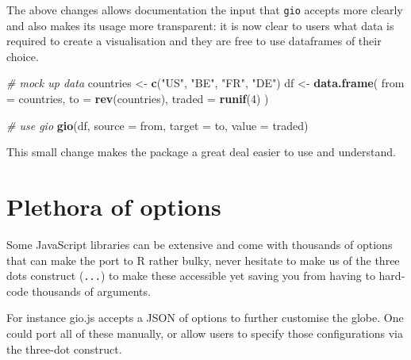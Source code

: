\documentclass[
]{krantz}
\makeatletter
\newenvironment{Shaded}{\begin{snugshade}}{\end{snugshade}}
\newcommand{\CommentTok}[1]{\textcolor[rgb]{0.37,0.37,0.37}{\textit{#1}}}
\newcommand{\DataTypeTok}[1]{\textcolor[rgb]{0.27,0.27,0.27}{#1}}
\newcommand{\DecValTok}[1]{\textcolor[rgb]{0.06,0.06,0.06}{#1}}
\newcommand{\KeywordTok}[1]{\textcolor[rgb]{0.27,0.27,0.27}{\textbf{#1}}}
\newcommand{\NormalTok}[1]{#1}
\newcommand{\StringTok}[1]{\textcolor[rgb]{0.5,0.5,0.5}{#1}}
\newenvironment{kframe}{%
\medskip{}
\setlength{\fboxsep}{.8em}
 \def\at@end@of@kframe{}%
 \ifinner\ifhmode%
  \def\at@end@of@kframe{\end{minipage}}%
  \begin{minipage}{\columnwidth}%
 \fi\fi%
 \def\FrameCommand##1{\hskip\@totalleftmargin \hskip-\fboxsep
 \colorbox{shadecolor}{##1}\hskip-\fboxsep
     \hskip-\linewidth \hskip-\@totalleftmargin \hskip\columnwidth}%
 \MakeFramed {\advance\hsize-\width
   \@totalleftmargin\z@ \linewidth\hsize
   \@setminipage}}%
 {\par\unskip\endMakeFramed%
 \at@end@of@kframe}
\renewenvironment{Shaded}{\begin{kframe}}{\end{kframe}}
\makeatother
\begin{document}
The above changes allows documentation the input that \texttt{gio} accepts more clearly and also makes its usage more transparent: it is now clear to users what data is required to create a visualisation and they are free to use dataframes of their choice.

\begin{Shaded}
\begin{Highlighting}[]
\CommentTok{\# mock up data}
\NormalTok{countries <{-}}\StringTok{ }\KeywordTok{c}\NormalTok{(}\StringTok{"US"}\NormalTok{, }\StringTok{"BE"}\NormalTok{, }\StringTok{"FR"}\NormalTok{, }\StringTok{"DE"}\NormalTok{)}
\NormalTok{df <{-}}\StringTok{ }\KeywordTok{data.frame}\NormalTok{(}
  \DataTypeTok{from =}\NormalTok{ countries,}
  \DataTypeTok{to =} \KeywordTok{rev}\NormalTok{(countries),}
  \DataTypeTok{traded =} \KeywordTok{runif}\NormalTok{(}\DecValTok{4}\NormalTok{)}
\NormalTok{)}

\CommentTok{\# use gio}
\KeywordTok{gio}\NormalTok{(df, }\DataTypeTok{source =}\NormalTok{ from, }\DataTypeTok{target =}\NormalTok{ to, }\DataTypeTok{value =}\NormalTok{ traded)}
\end{Highlighting}
\end{Shaded}

This small change makes the package a great deal easier to use and understand.

\hypertarget{plethora-of-options}{%
\section{Plethora of options}\label{plethora-of-options}}

Some JavaScript libraries can be extensive and come with thousands of options that can make the port to R rather bulky, never hesitate to make us of the three dots construct (\texttt{...}) to make these accessible yet saving you from having to hard-code thousands of arguments.

For instance gio.js accepts a JSON of options to further customise the globe. One could port all of these manually, or allow users to specify those configurations via the three-dot construct.
\end{document}
